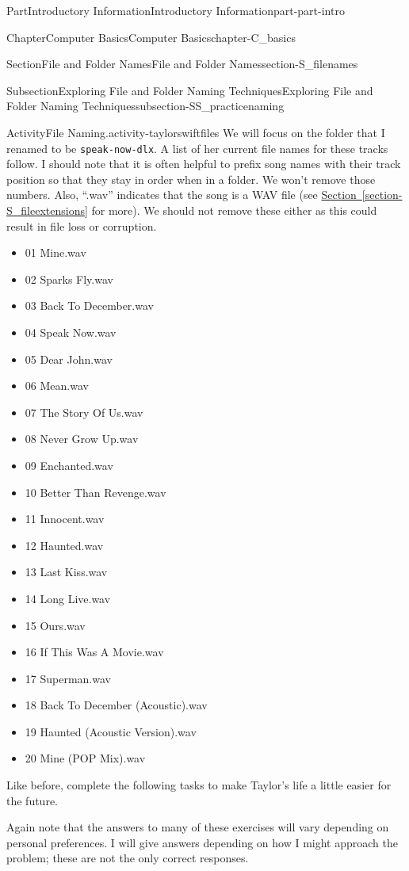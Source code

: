 \documentclass[oneside,10pt,]{book}
\newcommand{\xreffont}{\relax}
\newcommand{\mono}[1]{\texttt{#1}}
\begin{document}
\begin{partptx}{Part}{Introductory Information}{}{Introductory Information}{}{}{part-part-intro}
\begin{chapterptx}{Chapter}{Computer Basics}{}{Computer Basics}{}{}{chapter-C_basics}
\begin{sectionptx}{Section}{File and Folder Names}{}{File and Folder Names}{}{}{section-S_filenames}
\begin{subsectionptx}{Subsection}{Exploring File and Folder Naming Techniques}{}{Exploring File and Folder Naming Techniques}{}{}{subsection-SS_practicenaming}
\begin{activity}{Activity}{File Naming.}{activity-taylorswiftfiles}
We will focus on the folder that I renamed to be \mono{speak-now-dlx}. A list of her current file names for these tracks follow. I should note that it is often helpful to prefix song names with their track position so that they stay in order when in a folder. We won't remove those numbers. Also, ``.wav'' indicates that the song is a WAV file (see \hyperref[section-S_fileextensions]{Section~{\xreffont\ref{section-S_fileextensions}}} for more). We should not remove these either as this could result in file loss or corruption.%
\begin{multicols}{2}
\begin{itemize}[label=\textbullet]
\item{}01 Mine.wav%
\item{}02 Sparks Fly.wav%
\item{}03 Back To December.wav%
\item{}04 Speak Now.wav%
\item{}05 Dear John.wav%
\item{}06 Mean.wav%
\item{}07 The Story Of Us.wav%
\item{}08 Never Grow Up.wav%
\item{}09 Enchanted.wav%
\item{}10 Better Than Revenge.wav%
\item{}11 Innocent.wav%
\item{}12 Haunted.wav%
\item{}13 Last Kiss.wav%
\item{}14 Long Live.wav%
\item{}15 Ours.wav%
\item{}16 If This Was A Movie.wav%
\item{}17 Superman.wav%
\item{}18 Back To December (Acoustic).wav%
\item{}19 Haunted (Acoustic Version).wav%
\item{}20 Mine (POP Mix).wav%
\end{itemize}
\end{multicols}
%
\par
Like before, complete the following tasks to make Taylor's life a little easier for the future.%
\par
Again note that the answers to many of these exercises will vary depending on personal preferences. I will give answers depending on how I might approach the problem; these are not the only correct responses.%
\begin{enumerate}[font=\bfseries,label=(\alph*),ref=\alph*]%

\end{enumerate}
\end{activity}
\end{subsectionptx}
\end{sectionptx}
\end{chapterptx}
\end{partptx}
\end{document}
